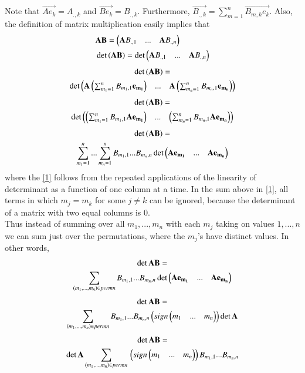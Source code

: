 \documentclass[journal,12pt,twocolumn]{IEEEtran}
\begin{document}
Note that $\vec{Ae_k} = A_{.,k}$ and $\vec{Be_k} = B_{.,k}$. Furthermore, $\vec{B_{.,k}} =\sum_{m=1}^{n}\vec{B_{m,k}e_k}$. Also, the definition of matrix multiplication easily implies that
\begin{align}
& \mathbf{AB} = \begin{pmatrix}\mathbf{A}B_{.,1} & ... & \mathbf{A}B_{.,n}\end{pmatrix}\label{2} \\
& \det\mathbf{(AB)}  = \det\begin{pmatrix}\mathbf{A}B_{.,1} & ... & \mathbf{A}B_{.,n}\end{pmatrix} 
\end{align}
\begin{multline}
\det\mathbf{(AB)}  = \\ \det\begin{pmatrix}\mathbf{A}\left(\sum_{m_1=1}^{n}B_{m_1,1}\mathbf{e_{m_1}}\right) & ... & \mathbf{A}\left(\sum_{m_n=1}^{n}B_{m_n,1}\mathbf{e_{m_n}}\right)\end{pmatrix}
\end{multline}
\begin{multline}
\det\mathbf{(AB)}  = \\
\det\begin{pmatrix}\left(\sum_{m_1=1}^{n}B_{m_1,1}\mathbf{A}\mathbf{e_{m_1}}\right) & ... & \left(\sum_{m_n=1}^{n}B_{m_n,1}\mathbf{A}\mathbf{e_{m_n}}\right)\end{pmatrix} 
\end{multline}
\begin{multline}
\det\mathbf{(AB)}  = \\
\sum_{m_1=1}^{n}...\sum_{m_n=1}^{n}B_{m_1,1}...B_{m_n,n}\det\begin{pmatrix}\mathbf{A}\mathbf{e_{m_1}} & ... & \mathbf{A}\mathbf{e_{m_n}}\end{pmatrix}\label{1}
\end{multline}
where the \eqref{1} follows from the repeated applications of the linearity of determinant
as a function of one column at a time. In the sum above in \eqref{1}, all terms in which $m_j = m_k $ for some $j\not= k$ can be ignored, because the determinant
of a matrix with two equal columns is 0. \\
Thus instead of summing over all $m_1,...,m_n$ with each $m_j$ taking on values $1,...,n$ we can sum just over the permutations, where the $m_j$’s have distinct values. In other words,
\begin{multline}
\det\mathbf{AB} = \\ \sum_{(m_1,...,m_n) \in perm n}{} B_{m_1,1}...B_{m_n,n}\det\begin{pmatrix}\mathbf{A}\mathbf{e_{m_1}} & ... & \mathbf{A}\mathbf{e_{m_n}}\end{pmatrix}
\end{multline}
\begin{multline}
	\det\mathbf{AB} = \\ \sum_{(m_1,...,m_n) \in perm n}{} 
B_{m_1,1}...B_{m_n,n}\left(sign\begin{pmatrix}m_1 & ...&m_n\end{pmatrix}\right)\det\mathbf{A}
\end{multline}
\begin{multline}
	\det\mathbf{AB} = \\ \det\mathbf{A}\sum_{(m_1,...,m_n) \in perm n}{} 
	\left(sign\begin{pmatrix}m_1 & ...&m_n\end{pmatrix}\right)B_{m_1,1}...B_{m_n,n}
\end{multline}
\end{document}
